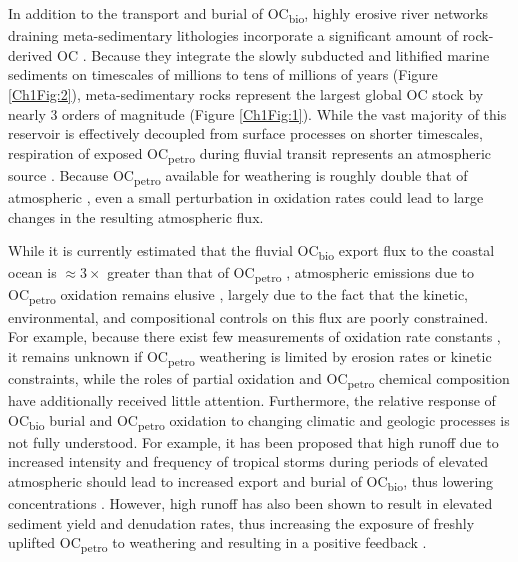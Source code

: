 In addition to the transport and burial of OC\textsubscript{bio}, highly erosive river networks draining meta-sedimentary lithologies incorporate a significant amount of rock-derived OC \citep[OC\textsubscript{petro}; \textit{e.g.}][]{Hilton:2011jw,Galy:2015fx}. Because they integrate the slowly subducted and lithified marine sediments on timescales of millions to tens of millions of years (Figure \ref{Ch1Fig:2}), meta-sedimentary rocks represent the largest global OC stock by nearly $3$ orders of magnitude (Figure \ref{Ch1Fig:1}). While the vast majority of this reservoir is effectively decoupled from surface processes on shorter timescales, respiration of exposed OC\textsubscript{petro} during fluvial transit represents an atmospheric  source \citep{Galy:2008ff,Bouchez:2010if,Hilton:2014dh}. Because OC\textsubscript{petro} available for weathering is roughly double that of atmospheric  \citep[\textit{i.e.} 1100 PgC in the upper $1$ m;][]{Copard:2007bf}, even a small perturbation in oxidation rates could lead to large changes in the resulting atmospheric  flux. 

While it is currently estimated that the fluvial OC\textsubscript{bio} export flux to the coastal ocean is $\approx 3\times$ greater than that of OC\textsubscript{petro} \citep{Galy:2015fx}, atmospheric  emissions due to OC\textsubscript{petro} oxidation remains elusive \citep{Galy:2008ff,Bouchez:2010if,Hilton:2014dh}, largely due to the fact that the kinetic, environmental, and compositional controls on this flux are poorly constrained. For example, because there exist few measurements of oxidation rate constants \citep{Chang:1999vo}, it remains unknown if OC\textsubscript{petro} weathering is limited by erosion rates or kinetic constraints, while the roles of partial oxidation \citep{Schillawski:2008ko} and OC\textsubscript{petro} chemical composition \citep{Galy:2008ff} have additionally received little attention. Furthermore, the relative response of OC\textsubscript{bio} burial and OC\textsubscript{petro} oxidation to changing climatic and geologic processes is not fully understood. For example, it has been proposed that high runoff due to increased intensity and frequency of tropical storms during periods of elevated atmospheric  should lead to increased export and burial of OC\textsubscript{bio}, thus lowering  concentrations \citep[\textit{i.e.} a negative feedback loop;][]{Hilton:2008fo}. However, high runoff has also been shown to result in elevated sediment yield and denudation rates, thus increasing the exposure of freshly uplifted OC\textsubscript{petro} to weathering and resulting in a positive feedback \citep{Hilton:2014dh}.

